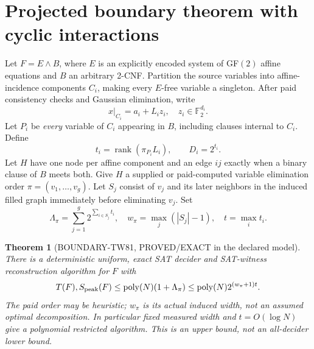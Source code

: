 \documentclass[11pt]{article}
\newtheorem{theorem}{Theorem}
\begin{document}
\section{Projected boundary theorem with cyclic interactions}
Let $F=E\land B$, where $E$ is an explicitly encoded system of GF$(2)$ affine equations and $B$ an arbitrary 2-CNF. Partition the source variables into affine-incidence components $C_i$, making every $E$-free variable a singleton. After paid consistency checks and Gaussian elimination, write
\[
x|_{C_i}=a_i+L_i z_i,\quad z_i\in\mathbb F_2^{d_i}.
\]
Let $P_i$ be \emph{every} variable of $C_i$ appearing in $B$, including clauses internal to $C_i$. Define
\[
t_i=\operatorname{rank}(\pi_{P_i}L_i),\qquad D_i=2^{t_i}.
\]
Let $H$ have one node per affine component and an edge $ij$ exactly when a binary clause of $B$ meets both. Give $H$ a supplied or paid-computed variable elimination order $\pi=(v_1,\ldots,v_g)$. Let $S_j$ consist of $v_j$ and its later neighbors in the induced filled graph immediately before eliminating $v_j$. Set
\[
\Lambda_{\pi}=\sum_{j=1}^{g}2^{\sum_{i\in S_j}t_i},\quad
w_\pi=\max_j(|S_j|-1),\quad t=\max_i t_i.
\]
\begin{theorem}[BOUNDARY-TW81, PROVED/EXACT in the declared model]
There is a deterministic uniform, exact SAT decider and SAT-witness reconstruction algorithm for $F$ with
\[
T(F),S_{\rm peak}(F)\le\operatorname{poly}(N)(1+\Lambda_\pi)
\le\operatorname{poly}(N)2^{(w_\pi+1)t}.
\]
The paid order may be heuristic; $w_\pi$ is its \emph{actual induced width}, not an assumed optimal decomposition. In particular fixed measured width and $t=O(\log N)$ give a polynomial restricted algorithm. This is an upper bound, not an all-decider lower bound.
\end{theorem}
\end{document}
